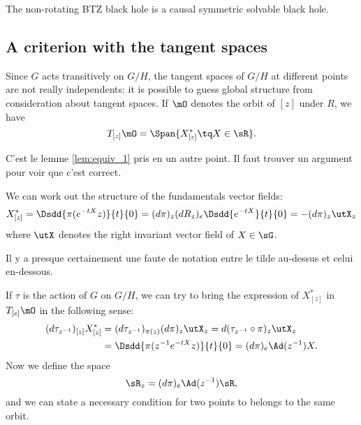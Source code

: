 \begin{corollary}
 The non-rotating BTZ black hole is a causal symmetric solvable black hole.
\end{corollary}
\subsection{A criterion with the tangent spaces}\label{subsec:R_z}

Since $G$ acts transitively on $G/H$, the tangent spaces of $G/H$ at different points are not really independents: it is possible to guess global structure from consideration about tangent spaces. If $\mO$ denotes the orbit of $[z]$ under $R$, we have
\[
   T_{[z]}\mO=\Span\{X^*_{[z]}\tq X\in\sR\}.
\]
\begin{probleme}
C'est le lemme \ref{lem:equiv_1} pris en un autre point. Il faut trouver un argument pour voir que c'est correct.
\end{probleme}

We can work out the structure of the fundamentals vector fields:
 \begin{equation}
  X^*_{[z]}=\Dsdd{ \pi(e^{-tX}z) }{t}{0}
	   =(d\pi)_z(dR_z)_e\Dsdd{e^{-tX}}{t}{0}
	   =-(d\pi)_z\utX_z
\end{equation}
where $\utX$ denotes the right invariant vector field of $X\in\sG$. 

\begin{probleme}
Il y a presque certainement une faute de notation entre le tilde au-dessus et celui en-dessous.
\end{probleme}

If $\tau$ is the action of $G$ on $G/H$, we can try to bring the expression of $X^*_{[z]}$ in $T_{[e]}\mO$ in the following sense:
\begin{equation}
\begin{split}
(d\tau_{z^{-1}})_{[z]}X^*_{[z]}&=(d\tau_{z^{-1}})_{\pi(z)}(d\pi)_z\utX_z
                              =d(\tau_{z^{-1}}\circ \pi)_z\utX_z\\
			      &=\Dsdd{ \pi( z^{-1} e^{-tX}z ) }{t}{0}
			      =(d\pi)_e\Ad(z^{-1})X.
\end{split}
\end{equation}
Now we define the space
\begin{equation}
\sR_z=(d\pi)_e\Ad(z^{-1})\sR,
\end{equation}
and we can state a necessary condition for two points to belongs to the same orbit.

